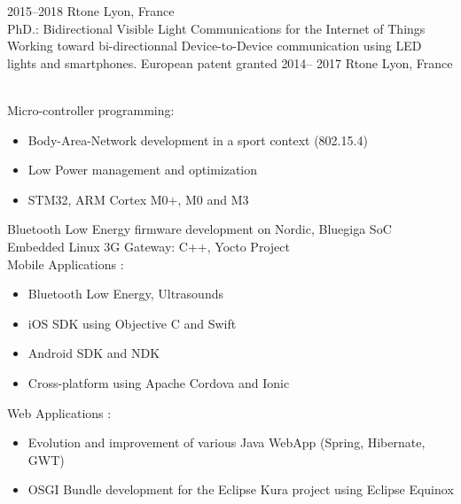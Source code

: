 \documentclass[]{cv-style}          %
\begin{document}
\begin{entrylist}
\entry
  {2015--2018}
  {Rtone}
  {Lyon, France}
  {\\
  PhD.: Bidirectional Visible Light Communications for
 the Internet of Things\\
  Working toward bi-directionnal Device-to-Device communication using LED lights and smartphones. European patent granted}
\entry
  {2014-- 2017}
  {Rtone}
  {Lyon, France}
  {\\
  Micro-controller programming:
  \begin{itemize}
    \item Body-Area-Network development in a sport context (802.15.4)
    \item Low Power management and optimization
    \item STM32, ARM Cortex M0+, M0 and M3
  \end{itemize}
  Bluetooth Low Energy firmware development on Nordic, Bluegiga SoC\\
  Embedded Linux 3G Gateway: C++, Yocto Project\\
  Mobile Applications :
  \begin{itemize}
    \item Bluetooth Low Energy, Ultrasounds
    \item iOS SDK using Objective C and Swift
    \item Android SDK and NDK
    \item Cross-platform using Apache Cordova and Ionic
  \end{itemize}
  Web Applications :
  \begin{itemize}
    \item Evolution and improvement of various Java WebApp (Spring, Hibernate, GWT)
    \item OSGI Bundle development for the Eclipse Kura project using Eclipse Equinox
  \end{itemize}}
\end{entrylist}
\end{document}
